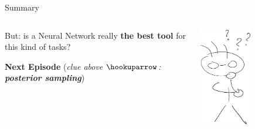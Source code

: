 \documentclass[9pt]{beamer}
\begin{document}
\begin{frame}{Summary}
    \begin{columns}
        \begin{column}{0.65\textwidth}
            But: is a Neural Network really \textbf{the best tool} for this
            kind of tasks?
            \vspace*{10pt}

            \hspace*{20pt}\textbf{Next Episode}
            {\footnotesize (\textit{clue above $\hookuparrow$:
            \textbf{posterior sampling}})}
        \end{column}
        \begin{column}{0.25\textwidth}
            \hspace*{-10pt}
            \includegraphics[width=0.5\textwidth]{skeptic}
        \end{column}
    \end{columns}
\end{frame}
\end{document}
